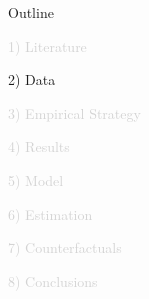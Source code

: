 \documentclass[aspectratio=169]{beamer}
\begin{document}

\begin{frame}[noframenumbering]{Outline}

\Large

\textcolor{lightgray}{1) Literature}

\vspace{3mm}

2) Data

\vspace{3mm}

\textcolor{lightgray}{3) Empirical Strategy}

\vspace{3mm}

\textcolor{lightgray}{4) Results}

\vspace{3mm}

\textcolor{lightgray}{5) Model}

\vspace{3mm}

\textcolor{lightgray}{6) Estimation}

\vspace{3mm}

\textcolor{lightgray}{7) Counterfactuals}

\vspace{3mm}

\textcolor{lightgray}{8) Conclusions}


\end{frame}

\end{document}
